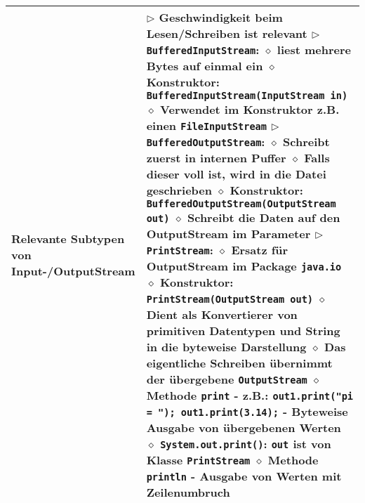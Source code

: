\begin{longtable}{ | p{4cm} p{13.5cm} | }
	\makecell[l]{Relevante Subtypen  von \\Input-/OutputStream} & \makecell[l]{
	$\rhd$ Geschwindigkeit beim Lesen/Schreiben ist relevant \\
	$\rhd$ \texttt{BufferedInputStream}: \\
	\hspace{0.4cm} $\diamond$ liest mehrere Bytes auf einmal ein \\
	\hspace{0.4cm} $\diamond$ Konstruktor: \texttt{BufferedInputStream(InputStream in)} \\
	\hspace{0.4cm} $\diamond$ Verwendet im Konstruktor z.B. einen \texttt{FileInputStream} \\
	$\rhd$ \texttt{BufferedOutputStream}: \\
	\hspace{0.4cm} $\diamond$ Schreibt zuerst in internen Puffer \\
	\hspace{0.4cm} $\diamond$ Falls dieser voll ist, wird in die Datei geschrieben \\
	\hspace{0.4cm} $\diamond$ Konstruktor: \texttt{BufferedOutputStream(OutputStream out)} \\
	\hspace{0.4cm} $\diamond$ Schreibt die Daten auf den OutputStream im Parameter \\
	$\rhd$ \texttt{PrintStream}: \\
	\hspace{0.4cm} $\diamond$ Ersatz für OutputStream im Package \texttt{java.io} \\
	\hspace{0.4cm} $\diamond$ Konstruktor: \texttt{PrintStream(OutputStream out)} \\
	\hspace{0.4cm} $\diamond$ Dient als Konvertierer von primitiven Datentypen und String \\
	\hspace{0.8cm} in die byteweise Darstellung \\
	\hspace{0.4cm} $\diamond$ Das eigentliche Schreiben übernimmt der übergebene \texttt{OutputStream} \\
	\hspace{0.4cm} $\diamond$ Methode \texttt{print} \\ 
	\hspace{0.6cm} - z.B.: \texttt{out1.print("pi = "); out1.print(3.14);} \\
	\hspace{0.6cm} - Byteweise Ausgabe von übergebenen Werten \\
	\hspace{0.4cm} $\diamond$ \texttt{System.out.print()}: \texttt{out} ist von Klasse \texttt{PrintStream} \\
	\hspace{0.4cm} $\diamond$ Methode \texttt{println} \\
	\hspace{0.6cm} - Ausgabe von Werten mit Zeilenumbruch} \\ \hline


\end{longtable}
